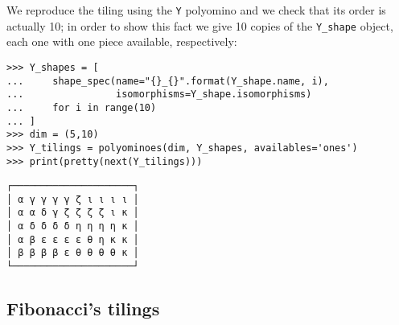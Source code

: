 We reproduce the tiling using the \verb|Y| polyomino and we check that its order is
actually 10; in order to show this fact we give 10 copies of the \verb|Y_shape| object,
each one with one piece available, respectively:
\begin{verbatim}
>>> Y_shapes = [
...     shape_spec(name="{}_{}".format(Y_shape.name, i),
...                isomorphisms=Y_shape.isomorphisms)
...     for i in range(10)
... ]
>>> dim = (5,10)
>>> Y_tilings = polyominoes(dim, Y_shapes, availables='ones')
>>> print(pretty(next(Y_tilings)))
\end{verbatim}
\begin{Verbatim}[baselinestretch=0.1, fontsize=\small]
┌─────────────────────┐
│ α γ γ γ γ ζ ι ι ι ι │
│ α α δ γ ζ ζ ζ ζ ι κ │
│ α δ δ δ δ η η η η κ │
│ α β ε ε ε ε θ η κ κ │
│ β β β β ε θ θ θ θ κ │
└─────────────────────┘
\end{Verbatim}

\subsection{Fibonacci's tilings}

\inputminted[fontsize=\small,stripnl=false, firstline=514,lastline=530]{python}{backtracking/polyominoes.py}

